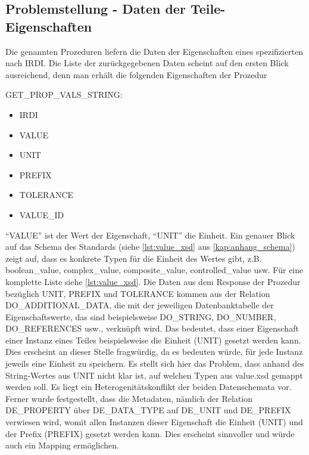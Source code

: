 \subsection{Problemstellung - Daten der Teile-Eigenschaften}\label{sec:problemdateneigenschaften}

Die genannten Prozeduren liefern die Daten der Eigenschaften eines spezifizierten  nach \gls{IRDI}. Die Liste der zurückgegebenen Daten scheint auf den ersten Blick ausreichend, denn man erhält die folgenden Eigenschaften der Prozedur

GET\_PROP\_VALS\_STRING:
\begin{multicols}{3}
\begin{itemize}
  \item IRDI
  \item VALUE
  \item UNIT
  \item PREFIX
  \item TOLERANCE
  \item VALUE\_ID
\end{itemize}
\end{multicols}

\enquote{VALUE} ist der Wert der Eigenschaft, \enquote{UNIT} die Einheit. Ein genauer Blick auf das Schema des Standards (siehe \autoref{lst:value_xsd} aus \autoref{kap:anhang_schema}) zeigt auf, dass es konkrete Typen für die Einheit des Wertes gibt, z.B. boolean\_value, complex\_value, composite\_value, controlled\_value usw. Für eine komplette Liste siehe \autoref{lst:value_xsd}. 
Die Daten aus dem Response der Prozedur bezüglich UNIT, PREFIX und TOLERANCE kommen aus der Relation DO\_ADDITIONAL\_DATA, die mit der jeweiligen Datenbanktabelle der Eigenschaftswerte, das sind beispielsweise DO\_STRING, DO\_NUMBER, DO\_REFERENCES usw., verknüpft wird. Das bedeutet, dass einer Eigenschaft einer Instanz eines Teiles beispielsweise die Einheit (UNIT) gesetzt werden kann. Dies erscheint an dieser Stelle fragwürdig, da es bedeuten würde, für jede Instanz jeweils eine Einheit zu speichern. 
Es stellt sich hier das Problem, dass anhand des String-Wertes aus UNIT nicht klar ist, auf welchen Typen aus value.xsd gemappt werden soll. Es liegt ein Heterogenitätskonflikt der beiden Datenschemata vor.  
Ferner wurde festgestellt, dass die Metadaten, nämlich der Relation DE\_PROPERTY über DE\_DATA\_TYPE auf DE\_UNIT und DE\_PREFIX verwiesen wird, womit allen Instanzen dieser Eigenschaft die Einheit (UNIT) und der Prefix (PREFIX) gesetzt werden kann. Dies erscheint sinnvoller und würde auch ein Mapping ermöglichen. 

